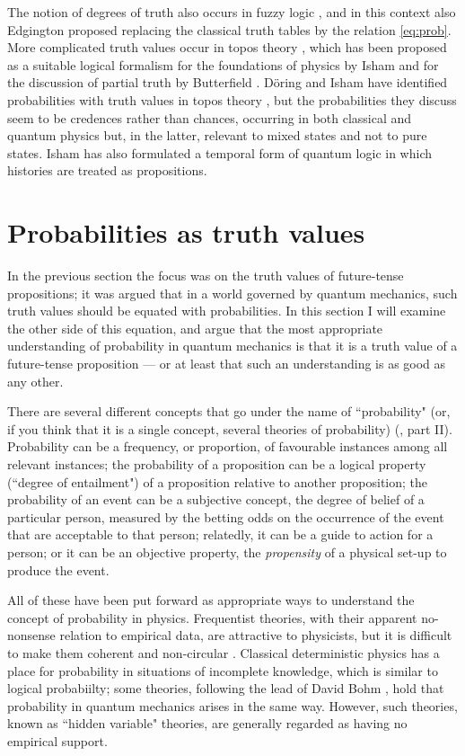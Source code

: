 \documentclass[12pt,a4paper,reqno]{article}
\renewcommand{\(}{\left(}
\renewcommand{\)}{\right)}
\newcommand{\<}{\langle}
\renewcommand{\>}{\rangle}
\theoremstyle{plain} %
\begin{document}
The notion of degrees of truth also occurs in fuzzy logic \cite{Zadeh:fuzzy,Edgington,Sainsbury}, and in this context also Edgington proposed replacing the classical truth tables by the relation \eqref{eq:prob}. More complicated truth values occur in topos theory \cite{Lawvere}, which has been proposed as a suitable logical formalism for the foundations of physics by Isham  \cite{Isham:topos} and for the discussion of partial truth by Butterfield \cite{Butterfield:partial}. D\"oring and Isham have identified probabilities with truth values in topos theory \cite{DoringIsham:prob}, but the probabilities they discuss seem to be credences rather than chances, occurring in both classical and quantum physics but, in the latter, relevant to mixed states and not to pure states. Isham has also formulated a temporal form of quantum logic \cite{Isham:temporalqlogic} in which histories are treated as propositions.

\section{Probabilities as truth values}

In the previous section the focus was on the truth values of future-tense propositions; it was argued that in a world governed by quantum mechanics, such truth values should be equated with probabilities. In this section I will examine the other side of this equation, and argue that the most appropriate understanding of probability in quantum mechanics is that it is a truth value of a future-tense proposition --- or at least that such an understanding is as good as any other.

There are several different concepts that go under the name of ``probability" (or, if you think that it is a single concept, several theories of probability) (\cite{Gillies}, \cite{Wallace:multiverse} part II). Probability can be a frequency, or proportion, of favourable instances among all relevant instances; the probability of a proposition can be a logical property (``degree of entailment") of a proposition relative to another proposition; the probability of an event can be a subjective concept, the degree of belief of a particular person, measured by the betting odds on the occurrence of the event that are acceptable to that person; relatedly, it can be a guide to action for a person; or it can be an objective property, the \emph{propensity} of a physical set-up to produce the event.  

All of these have been put forward as appropriate ways to understand the concept of probability in physics. Frequentist theories, with their apparent no-nonsense relation to empirical data, are attractive to physicists, but it is difficult to make them coherent and non-circular \cite{Wallace:multiverse}.  Classical deterministic physics has a place for probability in situations of incomplete knowledge, which is similar to logical probabiilty; some theories, following the lead of David Bohm \cite{Bohmian}, hold that probability in quantum mechanics arises in the same way. However, such theories, known as ``hidden variable" theories, are generally regarded as having no empirical support. 
\end{document}
